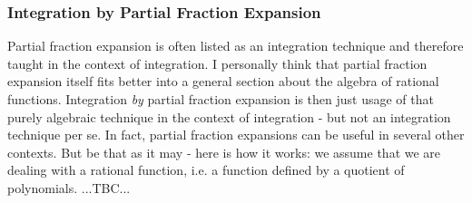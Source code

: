 \subsubsection{Integration by Partial Fraction Expansion} 
Partial fraction expansion is often listed as an integration technique and therefore taught in the context of integration. I personally think that partial fraction expansion itself fits better into a general section about the algebra of rational functions. Integration \emph{by} partial fraction expansion is then just usage of that purely algebraic technique in the context of integration - but not an integration technique per se. In fact, partial fraction expansions can be useful in several other contexts. But be that as it may - here is how it works: we assume that we are dealing with a rational function, i.e. a function defined by a quotient of polynomials. ...TBC...





